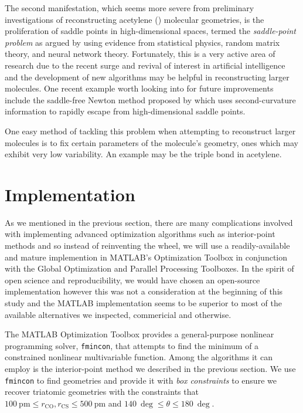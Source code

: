 The second manifestation, which seems more severe from preliminary investigations of reconstructing acetylene () molecular geometries, is the proliferation of saddle points in high-dimensional spaces, termed the \emph{saddle-point problem} as argued by \citet{Pascanu14} using evidence from statistical physics, random matrix theory, and neural network theory. Fortunately, this is a very active area of research due to the recent surge and revival of interest in artificial intelligence \citep{Bengio16,LeCun15} and the development of new algorithms may be helpful in reconstructing larger molecules. One recent example worth looking into for future improvements include the saddle-free Newton method proposed by \citet{Dauphin14} which uses second-curvature information to rapidly escape from high-dimensional saddle points.

One easy method of tackling this problem when attempting to reconstruct larger molecules is to fix certain parameters of the molecule's geometry, ones which may exhibit very low variability. An example may be the triple  bond in acetylene.

\section{Implementation}
As we mentioned in the previous section, there are many complications involved with implementing advanced optimization algorithms such as interior-point methods and so instead of reinventing the wheel, we will use a readily-available and mature implemention in MATLAB's Optimization Toolbox in conjunction with the Global Optimization and Parallel Processing Toolboxes. In the spirit of open science and reproducibility, we would have chosen an open-source implementation however this was not a consideration at the beginning of this study and the MATLAB implementation seems to be superior to most of the available alternatives we inspected, commericial and otherwise.

The MATLAB Optimization Toolbox provides a general-purpose nonlinear programming solver, \texttt{fmincon}, that attempts to find the minimum of a constrained nonlinear multivariable function. Among the algorithms it can employ is the interior-point method we described in the previous section.  We use \texttt{fmincon} to find geometries and provide it with \emph{box constraints} to ensure we recover triatomic geometries with the constraints that $\SI{100}{\pico\meter} \le r_\mathrm{CO}, r_\mathrm{CS} \le \SI{500}{\pico\meter}$ and $\SI{140}{\deg} \le \theta \le \SI{180}{\deg}$.

